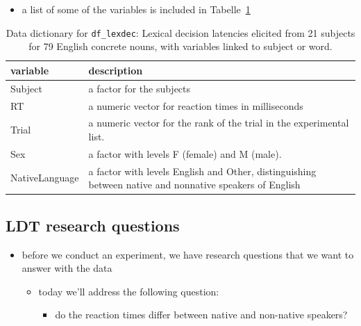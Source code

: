 \documentclass[
  letterpaper,
  DIV=11]{scrartcl}
\providecommand{\tightlist}{%
  \setlength{\itemsep}{0pt}\setlength{\parskip}{0pt}}\usepackage{longtable,booktabs,array}
\theoremstyle{definition}
\theoremstyle{remark}
\begin{document}
\begin{itemize}
\tightlist
\item
  a list of some of the variables is included in
  Tabelle~\ref{tbl-lexdec}
\end{itemize}

\hypertarget{tbl-lexdec}{}
\begin{table}
\caption{\label{tbl-lexdec}Data dictionary for \texttt{df\_lexdec}: Lexical decision latencies
elicited from 21 subjects for 79 English concrete nouns, with variables
linked to subject or word. }\tabularnewline

\centering
\begin{tabular}{l|l}
\hline
variable & description\\
\hline
Subject & a factor for the subjects\\
\hline
RT & a numeric vector for reaction times in milliseconds\\
\hline
Trial & a numeric vector for the rank of the trial in the experimental list.\\
\hline
Sex & a factor with levels F (female) and M (male).\\
\hline
NativeLanguage & a factor with levels English and Other, distinguishing between native and nonnative speakers of English\\
\hline
\end{tabular}
\end{table}

\hypertarget{ldt-research-questions}{%
\subsection{LDT research questions}\label{ldt-research-questions}}

\begin{itemize}
\tightlist
\item
  before we conduct an experiment, we have research questions that we
  want to answer with the data

  \begin{itemize}
  \tightlist
  \item
    today we'll address the following question:

    \begin{itemize}
    \tightlist
    \item
      do the reaction times differ between native and non-native
      speakers?
    \end{itemize}
  \end{itemize}
\end{itemize}
\end{document}
